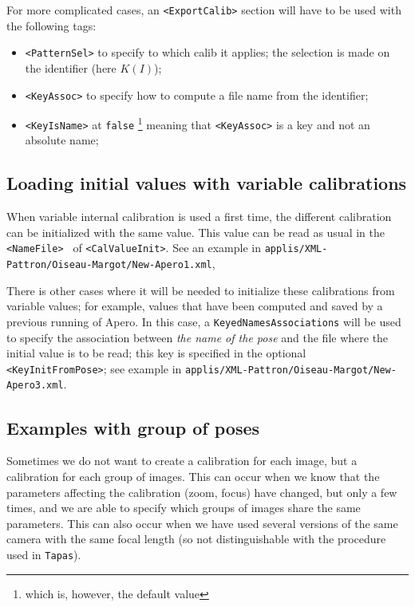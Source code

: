 For more complicated cases,  an {\tt <ExportCalib>} section  will have to be
used with the following tags:

\begin{itemize}
    \item {\tt <PatternSel>}  to specify to which calib it applies; the selection
         is made on the identifier (here $K(I)$);

    \item {\tt <KeyAssoc>}  to specify how to compute a file name from the identifier;

    \item {\tt <KeyIsName>}  at {\tt false} \footnote{which is, however, the default value} meaning
          that {\tt <KeyAssoc>}  is a key and not an absolute name;
\end{itemize}


\subsection{Loading initial values  with  variable calibrations}

When  variable internal calibration is used a first time,
the different calibration can be initialized with the same
value.  This value can be read as usual in the {\tt <NameFile> } of {\tt <CalValueInit>}.
See an example in {\tt  applis/XML-Pattron/Oiseau-Margot/New-Apero1.xml},

There is other cases where it will be needed to initialize these  calibrations
from variable values; for example, values  that have been computed and saved by a
previous running of Apero. In this case, a {\tt KeyedNamesAssociations} will be used
to specify the association between \emph{the  name of the pose} and the file where
the initial value is to be read; this key is specified in the optional
{\tt <KeyInitFromPose>}; see example in {\tt  applis/XML-Pattron/Oiseau-Margot/New-Apero3.xml}.


\subsection{Examples with group of poses}

Sometimes we do not want to create a calibration for each image,
but a calibration for each group of images. This can occur
when we know that the parameters affecting the calibration
(zoom, focus) have changed, but only a few times, and we are able
to specify which groups of images share the same parameters.
This can also occur when we have used several versions of the
same camera with the same focal length (so not distinguishable
with the procedure used in {\tt Tapas}).

